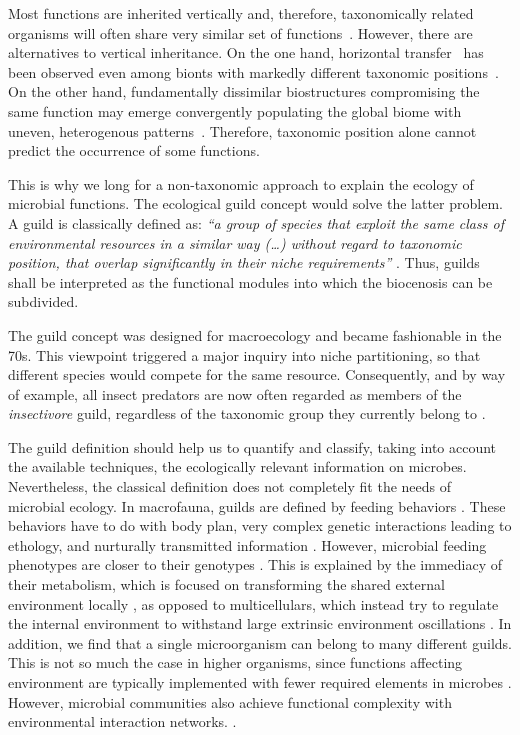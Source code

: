 \documentclass[Journal,letterpaper,NoLists]{ascelike-new}
\begin{document}
 Most functions are inherited vertically and, therefore, taxonomically related organisms will often share very similar set of functions~\cite{baiser2011relationship}. However, there are alternatives to vertical inheritance. On the one hand, horizontal transfer~\cite{van2017horizontal} has been observed even among bionts with markedly different taxonomic positions~\cite{husnik2018functional}. 
On the other hand, fundamentally dissimilar biostructures compromising the same function may emerge convergently populating the global biome with uneven, heterogenous patterns~\cite{page2008temporal,storz2016causes}. Therefore, taxonomic position alone cannot predict the occurrence of some functions. 

This is why we long for a non-taxonomic approach to explain the ecology of microbial functions. The ecological guild concept would solve the latter problem. A guild is classically defined as: \textit{“a group of species that exploit the same class of environmental resources in a similar way (…) without regard to taxonomic position, that overlap significantly in their niche requirements”} \cite{root1967niche}. Thus, guilds shall be interpreted as the functional modules into which the biocenosis can be subdivided. 

The guild concept was designed for macroecology and became fashionable in the 70s. This viewpoint triggered a major inquiry into niche partitioning, so that different species would compete for the same resource. Consequently, and by way of example, all insect predators are now often regarded as members of the \textit{insectivore} guild, regardless of the taxonomic group they currently belong to \cite{koran2014ecological,nebel2010declines}.

The guild definition should help us to quantify and classify, taking into account the available techniques, the ecologically relevant information on microbes. Nevertheless, the classical definition does not completely fit the needs of microbial ecology. In macrofauna, guilds are defined by feeding behaviors \cite{hohberg2003soil}. These behaviors have to do with body plan, very complex genetic interactions leading to ethology, and nurturally transmitted information \cite{chiel1997brain,hillis1996sexual}. However, microbial feeding phenotypes are closer to their genotypes \cite{torsvik2002microbial}. This is explained by the immediacy of their metabolism, which is focused on transforming the shared external environment locally \cite{paerl1996mini,shapiro1998thinking}, as opposed to multicellulars, which instead try to regulate the internal environment \cite{wangemann1996homeostatic} to withstand large extrinsic environment oscillations \cite{nemeskeri2019physiological}.  In addition, we find that a single microorganism can belong to many different guilds. This is not so much the case in higher organisms, since functions affecting environment are typically implemented with fewer required elements in microbes \cite{gregory2005genome,gregory2005comparative}. However, microbial communities also achieve functional complexity with environmental interaction networks. \cite{sanchez2022community}.
\end{document}
